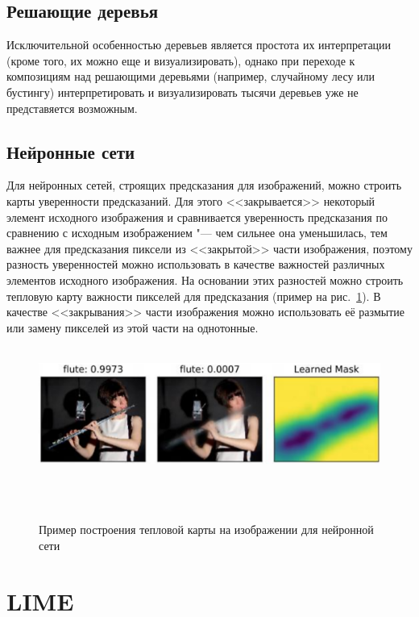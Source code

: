 \documentclass[12pt,a4paper]{article}
\begin{document}
\subsection{Решающие деревья}
	\par Исключительной особенностью деревьев является простота их интерпретации (кроме того, их можно еще и визуализировать), однако при переходе к композициям над решающими деревьями (например, случайному лесу или бустингу) интерпретировать и визуализировать тысячи деревьев уже не представяется возможным.
	
\subsection{Нейронные сети}
	\par Для нейронных сетей, строящих предсказания для изображений, можно строить карты уверенности предсказаний. Для этого <<закрывается>> некоторый элемент исходного изображения и сравнивается уверенность предсказания по сравнению с исходным изображением "--- чем сильнее она уменьшилась, тем важнее для предсказания пиксели из <<закрытой>> части изображения, поэтому разность уверенностей можно использовать в качестве важностей различных элементов исходного изображения. На основании этих разностей можно строить тепловую карту важности пикселей для предсказания (пример на рис.~\ref{neuro_heatmap}). В качестве <<закрывания>> части изображения можно использовать её размытие или замену пикселей из этой части на однотонные.

	\begin{center}
	\begin{figure}[!htb]
	 \centering
	 \includegraphics[width=1.0\linewidth]{neuro_heatmap.eps}
	 \caption{Пример построения тепловой карты на изображении для нейронной сети}
	 \label{neuro_heatmap}
	\end{figure}
	\end{center}

\section{LIME}
\end{document}
